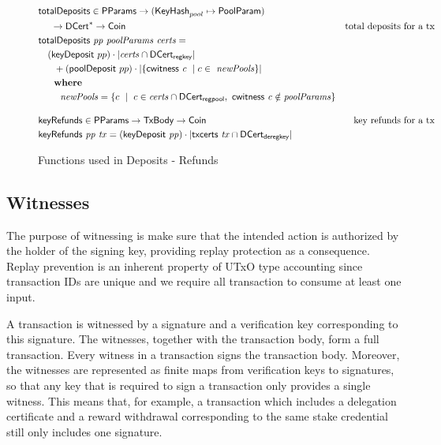 \begin{figure}[htb]
  \begin{align*}
    & \fun{totalDeposits} \in \PParams \to (\KeyHash_{pool}\mapsto\PoolParam) \\
    & ~~~~\to \seqof{\DCert} \to \Coin
    & \text{total deposits for a tx} \\
    & \totalDeposits{pp}{poolParams}{certs} = \\
    &  ~~~ (\fun{keyDeposit}~pp)\cdot|\var{certs}\cap\DCertRegKey| \\
    &  ~~~~~ + (\fun{poolDeposit}~pp)\cdot|\{\cwitness{c} ~\mid c\in~\var{newPools}\}| \\
    & ~~~\where \\
    &  ~~~~~~~ \var{newPools} = \{c ~\mid~ c\in\var{certs}\cap\DCertRegPool,~\cwitness{c}\notin \var{poolParams}\}
    \nextdef
      & \fun{keyRefunds} \in \PParams \to \TxBody \to \Coin
      & \text{key refunds for a tx} \\
      & \keyRefunds{pp}{tx} = (\fun{keyDeposit}~\var{pp})\cdot|\txcerts{tx} \cap \DCertDeRegKey|\\
      \end{align*}
      \caption{Functions used in Deposits - Refunds}
      \label{fig:functions:deposits-refunds}
  \end{figure}

\clearpage

\subsection{Witnesses}
\label{sec:witnesses-shelley}

The purpose of witnessing is make sure that the intended action is authorized by
the holder of the signing key, providing replay protection as a consequence.
Replay prevention is an inherent property of UTxO type accounting
since transaction IDs are unique and we require all transaction to
consume at least one input.

A transaction is witnessed by a signature and a verification key corresponding
to this signature.  The witnesses, together with the transaction body, form a
full transaction.  Every witness in a transaction signs the transaction body.
Moreover, the witnesses are represented as finite maps from verification keys to
signatures, so that any key that is required to sign a transaction only provides
a single witness.  This means that, for example, a transaction which includes a
delegation certificate and a reward withdrawal corresponding to the same stake
credential still only includes one signature.

